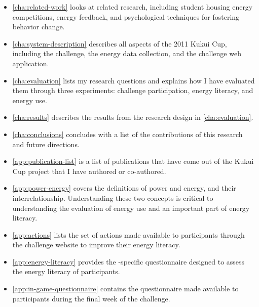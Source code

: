 \begin{itemize}
	\item \autoref{cha:related-work} looks at related research, including student housing energy competitions, energy feedback, and psychological techniques for fostering behavior change.
	\item \autoref{cha:system-description} describes all aspects of the 2011 Kukui Cup, including the challenge, the energy data collection, and the challenge web application.
	\item \autoref{cha:evaluation} lists my research questions and explains how I have evaluated them through three experiments: challenge participation, energy literacy, and energy use.
	\item \autoref{cha:results} describes the results from the research design in \autoref{cha:evaluation}.
	\item \autoref{cha:conclusions} concludes with a list of the contributions of this research and future directions.
	\item \autoref{app:publication-list} is a list of publications that have come out of the Kukui Cup project that I have authored or co-authored.
	\item \autoref{app:power-energy} covers the definitions of power and energy, and their interrelationship. Understanding these two concepts is critical to understanding the evaluation of energy use and an important part of energy literacy.
	\item \autoref{app:actions} lists the set of actions made available to participants through the challenge website to improve their energy literacy.
	\item \autoref{app:energy-literacy} provides the \Hawaii-specific questionnaire designed to assess the energy literacy of participants.
	\item \autoref{app:in-game-questionnaire} contains the questionnaire made available to participants during the final week of the challenge.
\end{itemize}
